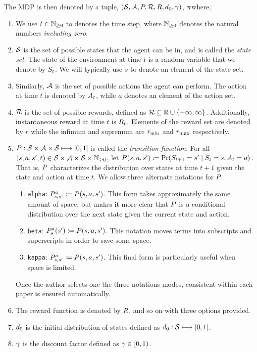 \documentclass[a4paper, 11pt]{article}
\begin{document}
The \gls{MDP} is then denoted by a tuple, $\MDP$, $\p$where;
%
\begin{enumerate}
    \item We use $\step$ to denotes the time step, where $\NZ$ denotes the natural numbers {\em including zero}.

    \item $\sset$ is the set of possible states that the agent can be in, and is called the {\em state set}. The state of the environment at time $t$ is a random variable that we denote by $\st{t}$. We will typically use $s$ to denote an element of the state set.

    \item Similarly, $\aset$ is the set of possible actions the agent can perform. The action at time $t$ is denoted by $\at{t}$, while $a$ denotes an element of the action set.

    \item $\rset$ is the set of possible rewards, defined as $\rsetdef$. Additionally, instantaneous reward at time $t$ is $\Rfun_t$. Elements of the reward set are denoted by $r$ while the infimum and supremum are $\rmin$ and $\rmax$ respectively.

    \item $\Tdef$ is called the {\em transition function}. For all $(s,a,s',t) \in \sset \times \aset \times \sset \times \NZ$, let $\Tfun(s,a,s')\coloneqq\Pr(\st{t+1}=s' \mid \st{t}=s, \at{t}=a)$.
    That is, $\Tfun$ characterizes the distribution over states at time $t+1$ given the state and action at time $t$.
    We allow three alternate notations for $\Tfun$.
    \begin{enumerate}
        \item {\tt alpha}: $\T{s}{a}{s'} \coloneqq \Tfun(s,a,s')$.
    This form takes approximately the same amount of space, but makes it more clear that $\Tfun$ is a conditional distribution over the next state given the current state and action.
        \item {\tt beta}: $\Tfun_{s}^{a}(s') \coloneqq \Tfun(s,a,s')$.
    This notation moves terms into subscripts and superscripts in order to save some space.
        \item {\tt kappa}: $\Tfun_{s,s'}^{a} \coloneqq \Tfun(s,a,s')$.
    This final form is particularly useful when space is limited.
    \end{enumerate}
    Once the author selects one the three notations modes, consistent within each paper is ensured automatically.

    \item The reward function is denoted by $\Rfun$, and so on with three options provided.

    \item $\isset$ is the initial distribution of states defined as $\issetdef$.
    \item $\D$ is the discount factor defined as $\Ddef$.

\end{enumerate}
%
\end{document}
